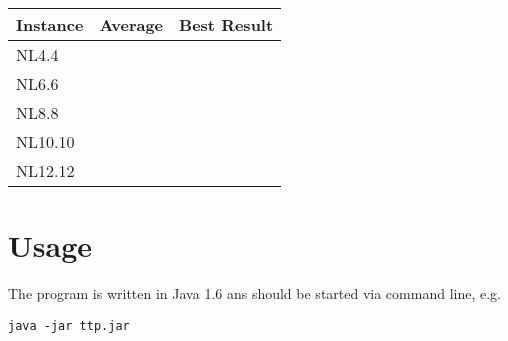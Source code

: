 \documentclass[a4paper,11pt]{article}
\begin{document}
\begin{center}
\begin{tabular}{| l | r | r |}
  \hline                       
  Instance& Average  & Best Result \\   \hline     \hline    
  NL4.4 & &  \\ \hline    
  NL6.6 &  &  \\ \hline   
  NL8.8 &   &\\ \hline  
  NL10.10 &   &  \\ \hline 
  NL12.12 &   & \\ \hline 

\end{tabular}
\end{center}


\section{Usage}
The program is written in Java 1.6 ans should be started via command line, e.g.
\lstset{language=sh}
\begin{lstlisting}
java -jar ttp.jar
\end{lstlisting}

\small


\end{document}
